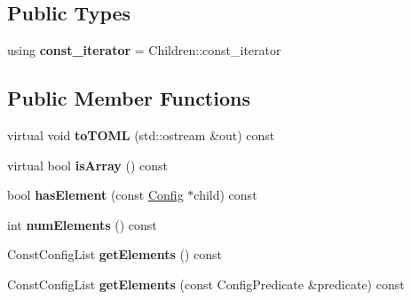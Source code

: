 \subsection*{Public Types}
\begin{DoxyCompactItemize}
\item 
\hypertarget{classtheoria_1_1config_1_1ConfigArray_ace80948768681e7eb033825f4fe761f2}{using {\bfseries const\+\_\+iterator} = Children\+::const\+\_\+iterator}\label{classtheoria_1_1config_1_1ConfigArray_ace80948768681e7eb033825f4fe761f2}

\end{DoxyCompactItemize}
\subsection*{Public Member Functions}
\begin{DoxyCompactItemize}
\item 
\hypertarget{classtheoria_1_1config_1_1ConfigArray_a2579b55d6bb834fd486067804884b260}{virtual void {\bfseries to\+T\+O\+M\+L} (std\+::ostream \&out) const }\label{classtheoria_1_1config_1_1ConfigArray_a2579b55d6bb834fd486067804884b260}

\item 
\hypertarget{classtheoria_1_1config_1_1ConfigArray_a1b580338a9b9e000dc82a165721b969a}{virtual bool {\bfseries is\+Array} () const }\label{classtheoria_1_1config_1_1ConfigArray_a1b580338a9b9e000dc82a165721b969a}

\item 
\hypertarget{classtheoria_1_1config_1_1ConfigArray_ae488a004d46b1cab839374fd790997fa}{bool {\bfseries has\+Element} (const \hyperlink{classtheoria_1_1config_1_1Config}{Config} $\ast$child) const }\label{classtheoria_1_1config_1_1ConfigArray_ae488a004d46b1cab839374fd790997fa}

\item 
\hypertarget{classtheoria_1_1config_1_1ConfigArray_a7c34219255e1d0b5c06312b2d247ddc2}{int {\bfseries num\+Elements} () const }\label{classtheoria_1_1config_1_1ConfigArray_a7c34219255e1d0b5c06312b2d247ddc2}

\item 
\hypertarget{classtheoria_1_1config_1_1ConfigArray_a79e9494795a956c8e79401f143db3c9c}{Const\+Config\+List {\bfseries get\+Elements} () const }\label{classtheoria_1_1config_1_1ConfigArray_a79e9494795a956c8e79401f143db3c9c}

\item 
\hypertarget{classtheoria_1_1config_1_1ConfigArray_a70232fde54769a5479ff00b1d559c560}{Const\+Config\+List {\bfseries get\+Elements} (const Config\+Predicate \&predicate) const }\label{classtheoria_1_1config_1_1ConfigArray_a70232fde54769a5479ff00b1d559c560}


\end{DoxyCompactItemize}
